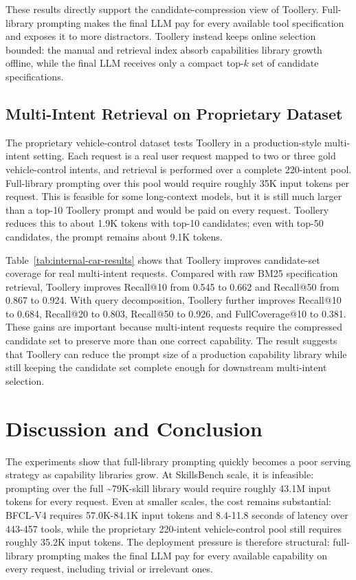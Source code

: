 \documentclass[11pt]{article}
\begin{document}
These results directly support the candidate-compression view of Toollery. Full-library prompting makes the final LLM pay for every available tool specification and exposes it to more distractors. Toollery instead keeps online selection bounded: the manual and retrieval index absorb capabilities library growth offline, while the final LLM receives only a compact top-$k$ set of candidate specifications.

\subsection{Multi-Intent Retrieval on Proprietary Dataset}
\label{subsec:internal-car-results}

The proprietary vehicle-control dataset tests Toollery in a production-style multi-intent setting. Each request is a real user request mapped to two or three gold vehicle-control intents, and retrieval is performed over a complete 220-intent pool. Full-library prompting over this pool would require roughly 35K input tokens per request. This is feasible for some long-context models, but it is still much larger than a top-10 Toollery prompt and would be paid on every request. Toollery reduces this to about 1.9K tokens with top-10 candidates; even with top-50 candidates, the prompt remains about 9.1K tokens.

Table~\ref{tab:internal-car-results} shows that Toollery improves candidate-set coverage for real multi-intent requests. Compared with raw BM25 specification retrieval, Toollery improves Recall@10 from 0.545 to 0.662 and Recall@50 from 0.867 to 0.924. With query decomposition, Toollery further improves Recall@10 to 0.684, Recall@20 to 0.803, Recall@50 to 0.926, and FullCoverage@10 to 0.381. These gains are important because multi-intent requests require the compressed candidate set to preserve more than one correct capability. The result suggests that Toollery can reduce the prompt size of a production capability library while still keeping the candidate set complete enough for downstream multi-intent selection.

\section{Discussion and Conclusion}
\label{sec:discussion_conclusion}

The experiments show that full-library prompting quickly becomes a poor serving strategy as capability libraries grow. At SkillsBench scale, it is infeasible: prompting over the full \textasciitilde{}79K-skill library would require roughly 43.1M input tokens for every request. Even at smaller scales, the cost remains substantial: BFCL-V4 requires 57.0K-84.1K input tokens and 8.4-11.8 seconds of latency over 443-457 tools, while the proprietary 220-intent vehicle-control pool still requires roughly 35.2K input tokens. The deployment pressure is therefore structural: full-library prompting makes the final LLM pay for every available capability on every request, including trivial or irrelevant ones.
\end{document}
